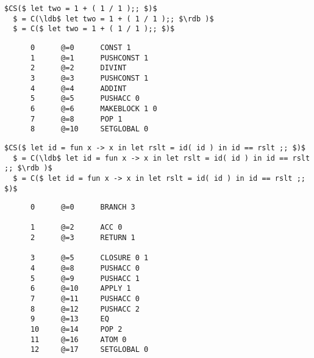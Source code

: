 \documentclass{article}
\newcommand{\ldb}{[\![}
\newcommand{\rdb}{]\!]}
\begin{document}
\lstset{language=[Objective]Caml}\begin{lstlisting}[mathescape]
  $CS($ let two = 1 + ( 1 / 1 );; $)$
  $ = C(\ldb$ let two = 1 + ( 1 / 1 );; $\rdb )$
  $ = C($ let two = 1 + ( 1 / 1 );; $)$  
\end{lstlisting}

    \begin{verbatim}
      0      @=0      CONST 1
      1      @=1      PUSHCONST 1
      2      @=2      DIVINT
      3      @=3      PUSHCONST 1
      4      @=4      ADDINT
      5      @=5      PUSHACC 0
      6      @=6      MAKEBLOCK 1 0
      7      @=8      POP 1
      8      @=10     SETGLOBAL 0
    \end{verbatim}

\lstset{language=[Objective]Caml}\begin{lstlisting}[mathescape]
  $CS($ let id = fun x -> x in let rslt = id( id ) in id == rslt ;; $)$
  $ = C(\ldb$ let id = fun x -> x in let rslt = id( id ) in id == rslt ;; $\rdb )$
  $ = C($ let id = fun x -> x in let rslt = id( id ) in id == rslt ;; $)$  
\end{lstlisting}

    \begin{verbatim}
      0      @=0      BRANCH 3

      1      @=2      ACC 0
      2      @=3      RETURN 1

      3      @=5      CLOSURE 0 1
      4      @=8      PUSHACC 0
      5      @=9      PUSHACC 1
      6      @=10     APPLY 1
      7      @=11     PUSHACC 0
      8      @=12     PUSHACC 2
      9      @=13     EQ
      10     @=14     POP 2
      11     @=16     ATOM 0
      12     @=17     SETGLOBAL 0
    \end{verbatim}
\end{document}
